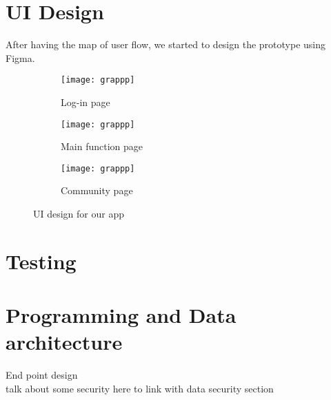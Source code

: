 \section{UI Design}
After having the map of user flow, we started to design the prototype using Figma.

\begin{figure}[ht]
     \centering
     \hspace{16mm}
     \begin{subfigure}[b]{0.2\textwidth}
         \centering
         \texttt{[image: grappp]}
         \caption{Log-in page}
         \label{Log-in page}
     \end{subfigure}
     \hfill
     \begin{subfigure}[b]{0.2\textwidth}
         \centering
         \texttt{[image: grappp]}
         \caption{Main function page}
         \label{Main function page}
     \end{subfigure}
     \hfill
     \begin{subfigure}[b]{0.2\textwidth}
         \centering
         \texttt{[image: grappp]}
         \caption{Community page}
         \label{Community page}
     \end{subfigure}
     \hspace{16mm}
        \caption{UI design for our app}
        \label{fig:three graphs}
\end{figure}

\section{Testing}

\section{Programming and Data architecture}
End point design
\\talk about some security here to link with data security section






